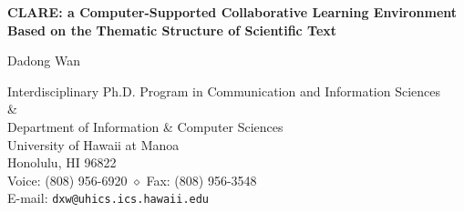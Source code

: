 


\thispagestyle{empty}

\begin{center}
  {\large\bf CLARE: a Computer-Supported Collaborative  Learning Environment\\
  Based on the Thematic Structure of Scientific Text}\\  \bigskip
  
  Dadong Wan\\ \medskip
  
  Interdisciplinary Ph.D. Program in Communication and Information Sciences\\
  \&\\
  Department of Information \& Computer Sciences\\
  University of Hawaii at Manoa\\
  Honolulu, HI 96822\\
  Voice: (808) 956-6920 $\diamond$ Fax: (808) 956-3548\\
  E-mail: {\tt dxw@uhics.ics.hawaii.edu}
\end{center}

